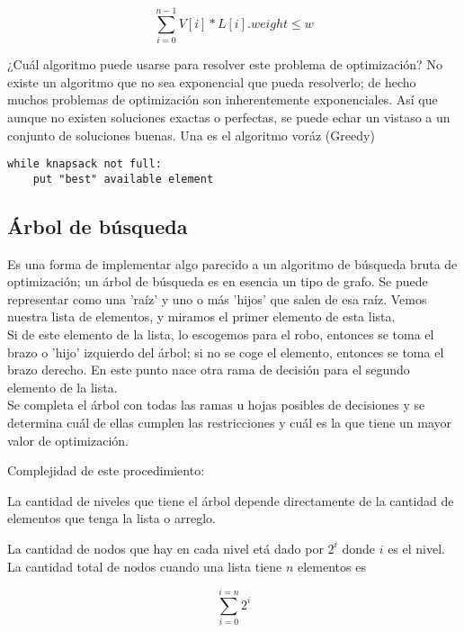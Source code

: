 \begin{equation}
    \sum_{i=0}^{n-1} V[i] * L[i].weight \leq w
\end{equation}


¿Cuál algoritmo puede usarse para resolver este problema de optimización?
No existe un algoritmo que no sea exponencial que pueda resolverlo; de hecho muchos problemas de optimización son inherentemente exponenciales. Así que aunque no existen soluciones exactas o perfectas, se puede echar un vistaso a un conjunto de soluciones buenas. Una es el algoritmo voráz (Greedy)

\begin{verbatim}
while knapsack not full:
    put "best" available element 
\end{verbatim}

\subsection{Árbol de búsqueda}

Es una forma de implementar algo parecido a un algoritmo de búsqueda bruta de optimización; un árbol de búsqueda es en esencia un tipo de grafo. 
Se puede representar como una 'raíz' y uno o más 'hijos' que salen de esa raíz. Vemos nuestra lista de elementos, y miramos el primer elemento de esta lista. \\

Si de este elemento de la lista, lo escogemos para el robo, entonces se toma el brazo o 'hijo' izquierdo del árbol; si no se coge el elemento, entonces se toma el brazo derecho. En este punto nace otra rama de decisión para el segundo elemento de la lista.\\

Se completa el árbol con todas las ramas u hojas posibles de decisiones y se determina cuál de ellas cumplen las restricciones y cuál es la que tiene un mayor valor de optimización.

Complejidad de este procedimiento:

La cantidad de niveles que tiene el árbol depende directamente de la cantidad de elementos que tenga la lista o arreglo.

La cantidad de nodos que hay en cada nivel etá dado por $2^{i}$ donde $i$ es el nivel.\\

La cantidad total de nodos cuando una lista tiene $n$ elementos es


\begin{equation}
    \sum_{i=0}^{i=n} 2^i
\end{equation}

